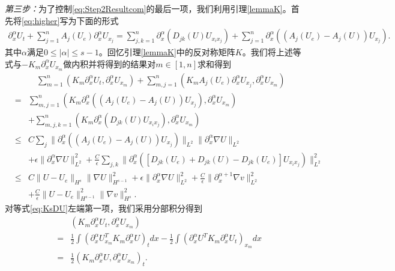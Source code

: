 \emph{第三步：}为了控制\eqref{eq:Step2Resultcom}的最后一项，我们利用引理\ref{lemmaK}。首先将\eqref{eq:higher}写为下面的形式
\begin{eqnarray*}
  \partial_x^\alpha  U_t + \sum_{j=1}^n A_j(U_e) \partial_x^\alpha  U_{x_j}
 = \sum_{j,k=1}^n  \partial_x^\alpha ( D_{jk} (U)U_{x_i x_j} ) + \sum_{j=1}^n \partial_x^\alpha ((A_j(U_e) - A_j(U))U_{x_j}).
\end{eqnarray*}
其中$\alpha$满足$0\le|\alpha|\le s-1$。回忆引理\ref{lemmaK}中的反对称矩阵$K$。我们将上述等式与$-K_m\partial_x^\alpha U_{x_m}$做内积并将得到的结果对$m \in [1,n]$求和得到
\begin{eqnarray} \label{eq:KsDU}
  && \quad \sum_{m=1}^n  (K_m \partial_x^\alpha U_t,\partial_x^\alpha U_{x_m}) + \sum_{m,j=1}^n (K_m A_j(U_e) \partial_x^\alpha U_{x_j}, \partial_x^\alpha U_{x_m}) \\
  &=&  \sum_{m,j=1}^n(K_m\partial_x^\alpha ( (A_j(U_e) - A_j(U)) U_{x_j}), \partial_x^\alpha U_{x_m}) \nonumber \\
 && +
  \sum_{m,j,k=1}^n (K_m \partial_x^\alpha (D_{jk} (U) U_{x_i x_j} ),\partial_x^\alpha U_{x_m}) \nonumber \\
 & \le&
  C\sum_j \|\partial_x^\alpha ((A_j(U_e)-A_j(U))U_{x_j})\|_{L^2} \|\partial_x^\alpha \nabla U\|_{L^2} \nonumber \\
  && + \epsilon \|\partial_x^\alpha \nabla U\|_{L^2}^2  + \frac{C}{\epsilon} \sum_{j,k} \| \partial_x^\alpha ([D_{jk} (U_e) + D_{jk} (U) - D_{jk} (U_e)]U_{x_i x_j}) \|_{L^2}^2  \nonumber \\
 &\le& C \|U-U_e\|_{H^s} \|\nabla U\|_{H^{s-1}}^2 + \epsilon \|\partial_x^\alpha \nabla U\|_{L^2}^2 + \frac{C}{\epsilon}  \|\partial_x^{\alpha+1} \nabla  v \|_{L^2}^2  \nonumber \\
&& + \frac{C}{\epsilon}\| U-U_e\|_{H^{s-1}}^2  \|\nabla  v \|_{H^s}^2 . \nonumber
\end{eqnarray}
对等式\eqref{eq:KsDU}左端第一项，我们采用分部积分得到
\begin{eqnarray} \label{eq:L1}
  &&(K_m \partial_x^\alpha U_t,\partial_x^\alpha U_{x_m})  \\
  &=& \frac{1}{2} \int (\partial_x^\alpha U_{x_m}^T K_m \partial_x^\alpha U)_t dx - \frac{1}{2} \int (\partial_x^\alpha U^T K_m \partial_x^\alpha U_t)_{x_m} dx \nonumber \\
  &=& \frac{1}{2} (K_m \partial_x^\alpha U,\partial_x^\alpha U_{x_m})_t. \nonumber
\end{eqnarray}

